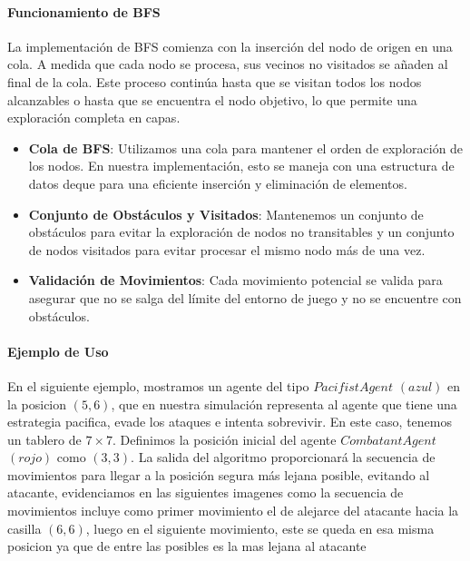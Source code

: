 \documentclass[11pt]{article}
\begin{document}
\paragraph{Funcionamiento de BFS}
La implementación de BFS comienza con la inserción del nodo de origen en una cola. A medida que cada nodo se procesa, sus vecinos no visitados se añaden al final de la cola. Este proceso continúa hasta que se visitan todos los nodos alcanzables o hasta que se encuentra el nodo objetivo, lo que permite una exploración completa en capas.

\begin{itemize}
    \item \textbf{Cola de BFS}: Utilizamos una cola para mantener el orden de exploración de los nodos. En nuestra implementación, esto se maneja con una estructura de datos deque para una eficiente inserción y eliminación de elementos.
    \item \textbf{Conjunto de Obstáculos y Visitados}: Mantenemos un conjunto de obstáculos para evitar la exploración de nodos no transitables y un conjunto de nodos visitados para evitar procesar el mismo nodo más de una vez.
    \item \textbf{Validación de Movimientos}: Cada movimiento potencial se valida para asegurar que no se salga del límite del entorno de juego y no se encuentre con obstáculos.
\end{itemize}

\paragraph{Ejemplo de Uso}
En el siguiente ejemplo, mostramos un agente del tipo $PacifistAgent$ \( (azul) \) en la posicion \( (5, 6) \), que en nuestra simulación representa al agente que tiene una estrategia pacifica, evade los ataques e intenta sobrevivir.
En este caso, tenemos un tablero de \(7 \times 7\). Definimos la posición inicial del agente $CombatantAgent$ \( (rojo) \) como \( (3, 3) \). La salida del algoritmo proporcionará la secuencia de movimientos para llegar a la posición segura más lejana posible, evitando al atacante, evidenciamos en las siguientes imagenes como
la secuencia de movimientos incluye como primer movimiento el de alejarce del atacante hacia la casilla \( (6, 6) \), luego en el siguiente movimiento, este se queda en esa misma posicion ya que de entre las posibles es la mas lejana al atacante
\end{document}
